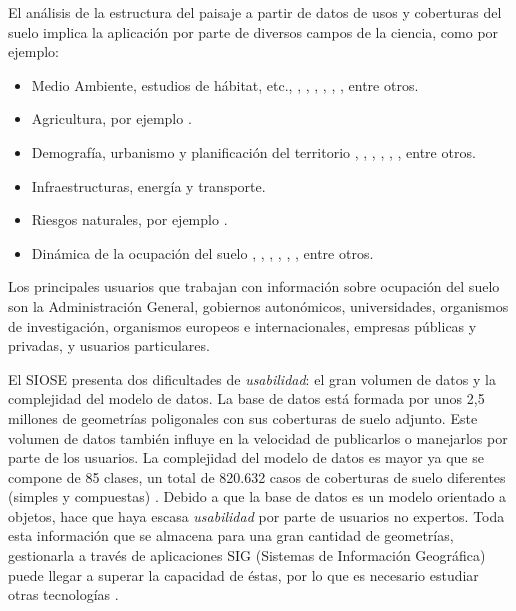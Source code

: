 El análisis de la estructura del paisaje a partir de datos de usos y coberturas del suelo implica la aplicación por parte de diversos campos de la ciencia, como por ejemplo:
\begin{itemize}
\item Medio Ambiente, estudios de hábitat, etc., \cite{Gine2014}, \cite{Hamilton2009}, \cite{Hebeisen2008}, \cite{GimenezFont2010}, \cite{Lin2014}, \cite{Brennan2005}, entre otros.
\item Agricultura, por ejemplo \cite{Zaragozi2011}.
\item Demografía, urbanismo y planificación del territorio \cite{Aguilera2011}, \cite{Blaschke1999}, \cite{Jacquin2008}, \cite{Tudor2014}, \cite{Aguilera2010}, \cite{Prastacos2017}, entre otros.
\item Infraestructuras, energía y transporte.
\item Riesgos naturales, por ejemplo \cite{Vazquez2017}.
\item Dinámica de la ocupación del suelo \cite{VanderKwast2011}, \cite{Dunk2011}, \cite{Herold2002}, \cite{Roces-Diaz2014}, \cite{Aguilera2012}, \cite{Liu2016}, entre otros.
\end{itemize}

Los principales usuarios que trabajan con información sobre ocupación del suelo son la Administración General, gobiernos autonómicos, universidades, organismos de investigación, organismos europeos e internacionales, empresas públicas y privadas, y usuarios particulares.

El SIOSE presenta dos dificultades de \textit{usabilidad}: el gran volumen de datos y la complejidad del modelo de datos. La base de datos está formada por unos 2,5 millones de geometrías poligonales con sus coberturas de suelo adjunto. Este volumen de datos también influye en la velocidad de publicarlos o manejarlos por parte de los usuarios. La complejidad del modelo de datos es mayor ya que se compone de 85 clases, un total de 820.632 casos de coberturas de suelo diferentes (simples y compuestas) \cite{FernandezVillarino2012}. Debido a que la base de datos es un modelo orientado a objetos, hace que haya escasa \textit{usabilidad} por parte de usuarios no expertos. Toda esta información que se almacena para una gran cantidad de geometrías, gestionarla a través de aplicaciones SIG (Sistemas de Información Geográfica) puede llegar a superar la capacidad de éstas, por lo que es necesario estudiar otras tecnologías \cite{NavarroCarrion2016}.


